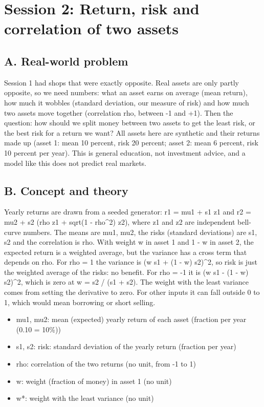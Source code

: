 \documentclass[11pt,a4paper]{article}
\begin{document}
\section{Session 2: Return, risk and correlation of two assets}

\subsection*{A. Real-world problem}
Session 1 had shops that were exactly opposite. Real assets are only partly opposite, so we need numbers: what an asset earns on average (mean return), how much it wobbles (standard deviation, our measure of risk) and how much two assets move together (correlation rho, between -1 and +1). Then the question: how should we split money between two assets to get the least risk, or the best risk for a return we want? All assets here are synthetic and their returns made up (asset 1: mean 10 percent, risk 20 percent; asset 2: mean 6 percent, risk 10 percent per year). This is general education, not investment advice, and a model like this does not predict real markets.

\subsection*{B. Concept and theory}
Yearly returns are drawn from a seeded generator: r1 = mu1 + s1 z1 and r2 = mu2 + s2 (rho z1 + sqrt(1 - rho\textasciicircum{}2) z2), where z1 and z2 are independent bell-curve numbers. The means are mu1, mu2, the risks (standard deviations) are s1, s2 and the correlation is rho. With weight w in asset 1 and 1 - w in asset 2, the expected return is a weighted average, but the variance has a cross term that depends on rho. For rho = 1 the variance is (w s1 + (1 - w) s2)\textasciicircum{}2, so risk is just the weighted average of the risks: no benefit. For rho = -1 it is (w s1 - (1 - w) s2)\textasciicircum{}2, which is zero at w = s2 / (s1 + s2). The weight with the least variance comes from setting the derivative to zero. For other inputs it can fall outside 0 to 1, which would mean borrowing or short selling.

\begin{itemize}[nosep]
\item mu1, mu2: mean (expected) yearly return of each asset (fraction per year (0.10 = 10\%))
\item s1, s2: risk: standard deviation of the yearly return (fraction per year)
\item rho: correlation of the two returns (no unit, from -1 to 1)
\item w: weight (fraction of money) in asset 1 (no unit)
\item w*: weight with the least variance (no unit)
\end{itemize}
\end{document}
